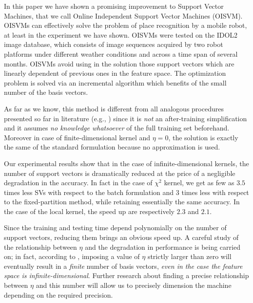 In this paper we have shown a promising improvement to Support Vector
Machines, that we call Online Independent Support Vector Machines
(OISVM). OISVMs can effectively solve the problem of place recognition
by a mobile robot, at least in the experiment we have shown. OISVMs
were tested on the IDOL2 image database, which consists of image
sequences acquired by two robot platforms under different weather
conditions and across a time span of several months.
OISVMs avoid using in the solution those
support vectors which are linearly dependent of previous ones in the
feature space. The optimization problem is solved via an incremental
algorithm which benefits of the small number of the basis vectors.

As far as we know, this method is different from all
analogous procedures presented so far in literature (e.g.,
\cite{DownsGM01,nguyen2005,LeeM01,schoel06,KeerthiCDC06}) since it
is \emph{not} an after-training simplification and it assumes
\emph{no knowledge whatsoever} of the full training set beforehand.
Moreover in case of finite-dimensional kernel and $\eta=0$, the
solution is exactly the same of the standard formulation because no
approximation is used.

Our experimental results show that in
the case of infinite-dimensional kernels, the number of support vectors
is dramatically reduced at the price of a negligible degradation in
the accuracy. In fact in the case of $\chi^2$ kernel, we get as few
as $3.5$ times less SVs with respect to the batch formulation and $3$
times less with respect to the fixed-partition method, while retaining
essentially the same accuracy. In the case of the local kernel,
the speed up are respectively $2.3$ and $2.1$.

Since the training and testing time depend polynomially on the number
of support vectors, reducing them brings an obvious speed up. A
careful study of the relationship between $\eta$ and the degradation
in performance is being carried on; in fact, according to
\cite{engel2004}, imposing a value of $\eta$ strictly larger than zero
will eventually result in a \emph{finite} number of basis vectors,
\emph{even in the case the feature space is
infinite-dimensional}. Further research about finding a precise
relationship between $\eta$ and this number will allow us to precisely
dimension the machine depending on the required precision.
